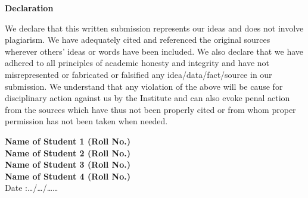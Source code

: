 \begin{center}
\thispagestyle{empty}
\LARGE{\textbf{Declaration}}\\[1cm]
\end{center}

We declare that this written submission represents our ideas and does not involve plagiarism. We have adequately cited and referenced the original sources wherever others’ ideas or words have been included. We also declare that we have adhered to all principles of academic honesty and integrity and have not misrepresented or fabricated or falsified any idea/data/fact/source in our submission. We understand that any violation of the above will be cause for disciplinary action against us by the Institute and can also evoke penal action from the sources which have thus not been properly cited or from whom proper permission has not been taken when needed. 

\vspace{1cm}
\noindent
\large{\textbf{Name of Student 1 (Roll No.)} } \\ 
\hspace{0.1cm}\large{\textbf{Name of Student 2 (Roll No.)} } \\ 
\hspace{0.1cm}\large{\textbf{Name of Student 3 (Roll No.)} } \\ 
\hspace{0.1cm}\large{\textbf{Name of Student 4 (Roll No.)} } \\ 


\vspace{5cm}
Date :\hspace{0.2cm}\ldots/\ldots/\ldots\ldots




